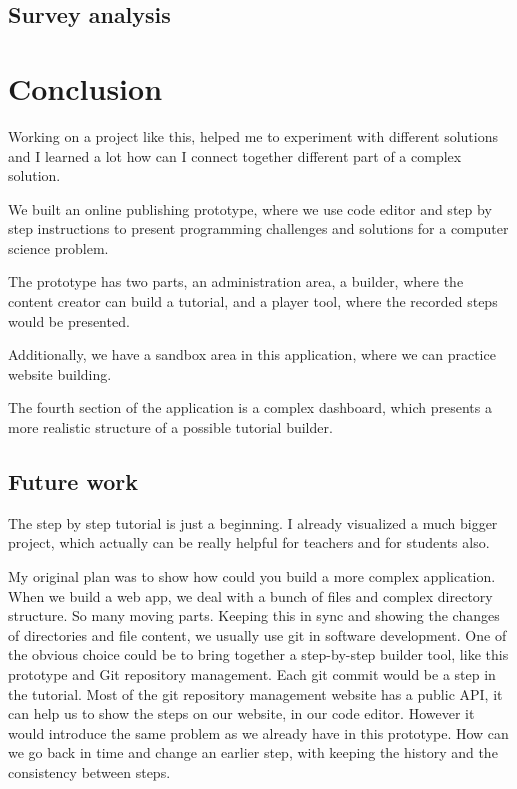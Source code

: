 \documentclass[12pt, a4paper, oneside, openright, medskipamount]{report}
\begin{document}
\subsection{Survey analysis}

\section{Conclusion}

Working on a project like this, helped me to experiment with different solutions and I learned a lot how can I connect together different part of a complex solution.

We built an online publishing prototype, where we use code editor and step by step instructions to present programming challenges and solutions for a computer science problem.

The prototype has two parts, an administration area, a builder, where the content creator can build a tutorial, and a player tool, where the recorded steps would be presented.

Additionally, we have a sandbox area in this application, where we can practice website building.

The fourth section of the application is a complex dashboard, which presents a more realistic structure of a possible tutorial builder.

\subsection{Future work}

The step by step tutorial is just a beginning. I already visualized a much bigger project, which actually can be really helpful for teachers and for students also.

My original plan was to show how could you build a more complex application. When we build a web app, we deal with a bunch of files and complex directory structure. So many moving parts. Keeping this in sync and showing the changes of directories and file content, we usually use git in software development. One of the obvious choice could be to bring together a step-by-step builder tool, like this prototype and Git repository management. Each git commit would be a step in the tutorial. Most of the git repository management website has a public API, it can help us to show the steps on our website, in our code editor. However it would introduce the same problem as we already have in this prototype. How can we go back in time and change an earlier step, with keeping the history and the consistency between steps.
\end{document}
